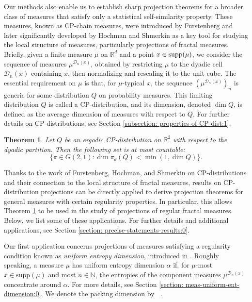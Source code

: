 \documentclass[a4paper,11pt]{amsart}
\newtheorem{theorem}{Theorem}[section]
\theoremstyle{definition}
\numberwithin{equation}{section}
\def\D{\mathcal{D}}
\def\R{\mathbb R}
\DeclareMathOperator{\dimP}{dim_P}
\begin{document}


Our methods also enable us to establish sharp projection theorems for a broader class of measures that satisfy only a statistical self-similarity property. These measures, known as CP-chain measures, were introduced by Furstenberg \cite{Furstenberg69} and later significantly developed by Hochman and Shmerkin \cite{HS2012} as a key tool for studying the local structure of measures, particularly projections of fractal measures.
Briefly, given a finite measure $\mu$ on $\R^d$ and a point $x\in {\rm supp} (\mu)$, we consider the sequence of measures $\mu^{\D_n(x)}$, obtained by restricting $\mu$ to the dyadic cell $\D_n(x)$ containing $x$, then normalizing and rescaling it to the unit cube. The essential requirement on $\mu$ is that, for $\mu$-typical $x$, the sequence $(\mu^{\D_n(x)})_n$ is generic for some distribution $Q$ on probability measures. This limiting distribution $Q$ is called a CP-distribution, and its dimension, denoted $\dim Q$, is defined as the average dimension of measures with respect to $Q$.
For further details on CP-distributions, see Section \ref{subsection: properties-of-CP-dist:1}.


\begin{theorem}\label{thm:proj-thm-cp-distribution:-2}
Let $Q$ be an ergodic CP-distribution on $\R^2$ with respect to the dyadic partition.  Then the following set is at most countable:
\[
\{\pi\in G(2,1): \dim \pi_\theta(Q)<\min(1,\dim Q)\}.
\]
\end{theorem}


Thanks to the work of Furstenberg, Hochman, and Shmerkin on CP-distributions and their connection to the local structure of fractal measures, results on CP-distribution projections can be directly applied to derive projection theorems for general measures with certain regularity properties. In particular, this allows Theorem \ref{thm:proj-thm-cp-distribution:-2} to be used in the study of projections of regular fractal measures.  Below, we list some of these applications. For further details and additional applications, see Section \ref{section: precise-statements-results:0}.

Our first application concerns projections of measures satisfying a regularity condition known as {\em uniform entropy dimension}, introduced in \cite{Hochman2014}.  Roughly speaking, a measure $\mu$ has uniform entropy dimension $\alpha$ if, for $\mu$-most $x \in \text{supp}(\mu)$  and most $n \in \mathbb{N}$, the entropies of the component measures $\mu^{\mathcal{D}_n(x)}$ concentrate around $\alpha$.
For more details, see Section \ref{section: meas-uniform-ent-dimension:0}. We denote the packing dimension by $\dimP$.
\end{document}
